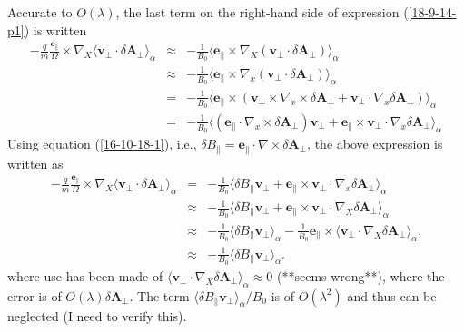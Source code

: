 \documentclass{llncs}
\begin{document}
Accurate to $O (\lambda)$, the last term on the right-hand side of expression
(\ref{18-9-14-p1}) is written
\begin{eqnarray*}
  - \frac{q}{m}  \frac{\mathbf{e}_{\parallel}}{\Omega} \times \nabla_X \langle
  \mathbf{v}_{\perp} \cdot \delta \mathbf{A}_{\perp} \rangle_{\alpha} &
  \approx & - \frac{1}{B_0} \langle \mathbf{e}_{\parallel} \times \nabla_X
  (\mathbf{v}_{\perp} \cdot \delta \mathbf{A}_{\perp}) \rangle_{\alpha}\\
  & \approx & - \frac{1}{B_0} \langle \mathbf{e}_{\parallel} \times \nabla_x
  (\mathbf{v}_{\perp} \cdot \delta \mathbf{A}_{\perp}) \rangle_{\alpha}\\
  & = & - \frac{1}{B_0} \langle \mathbf{e}_{\parallel} \times
  (\mathbf{v}_{\perp} \times \nabla_x \times \delta \mathbf{A}_{\perp}
  +\mathbf{v}_{\perp} \cdot \nabla_x \delta \mathbf{A}_{\perp})
  \rangle_{\alpha}\\
  & = & - \frac{1}{B_0} \langle (\mathbf{e}_{\parallel} \cdot \nabla_x \times
  \delta \mathbf{A}_{\perp}) \mathbf{v}_{\perp} +\mathbf{e}_{\parallel} \times
  \mathbf{v}_{\perp} \cdot \nabla_x \delta \mathbf{A}_{\perp} \rangle_{\alpha}
\end{eqnarray*}
Using equation (\ref{16-10-18-1}), i.e., $\delta B_{\parallel}
=\mathbf{e}_{\parallel} \cdot \nabla \times \delta \mathbf{A}_{\perp}$, the
above expression is written as
\begin{eqnarray}
  - \frac{q}{m}  \frac{\mathbf{e}_{\parallel}}{\Omega} \times \nabla_X \langle
  \mathbf{v}_{\perp} \cdot \delta \mathbf{A}_{\perp} \rangle_{\alpha} & = & -
  \frac{1}{B_0} \langle \delta B_{\parallel} \mathbf{v}_{\perp}
  +\mathbf{e}_{\parallel} \times \mathbf{v}_{\perp} \cdot \nabla_x \delta
  \mathbf{A}_{\perp} \rangle_{\alpha} \nonumber\\
  & \approx & - \frac{1}{B_0} \langle \delta B_{\parallel} \mathbf{v}_{\perp}
  +\mathbf{e}_{\parallel} \times \mathbf{v}_{\perp} \cdot \nabla_X \delta
  \mathbf{A}_{\perp} \rangle_{\alpha} \nonumber\\
  & \approx & - \frac{1}{B_0} \langle \delta B_{\parallel} \mathbf{v}_{\perp}
  \rangle_{\alpha} - \frac{1}{B_0} \mathbf{e}_{\parallel} \times \langle
  \mathbf{v}_{\perp} \cdot \nabla_X \delta \mathbf{A}_{\perp} \rangle_{\alpha}
  . \nonumber\\
  & \approx & - \frac{1}{B_0} \langle \delta B_{\parallel} \mathbf{v}_{\perp}
  \rangle_{\alpha} .  \label{16-10-18-p5}
\end{eqnarray}
where use has been made of $\langle \mathbf{v}_{\perp} \cdot \nabla_X \delta
\mathbf{A}_{\perp} \rangle_{\alpha} \approx 0$ (**seems wrong**), where the
error is of $O (\lambda) \delta \mathbf{A}_{\perp}$. The term $\langle \delta
B_{\parallel} \mathbf{v}_{\perp} \rangle_{\alpha} / B_0$ is of $O (\lambda^2)$
and thus can be neglected (I need to verify this).
\end{document}
